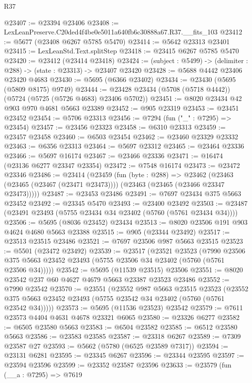\begin{lexlean}{R37}
\begin{coremodule}
@23407 := @23394 @23406
@23408 := LexLeanPreserve.C20ded4f4be0e5011a640fb6c30888a67.R37.__fits_103
@23412 := @5677 (@23408 @6267 @5785 @5470)
@23414 := @5642 @23313 @23401
@23415 := LexLeanStd.Text.splitStep
@23418 := @23415 @6267 @5785 @5470
@23420 := @23412 (@23414 @23418)
@23424 := (subject : @5499) -> (delimiter : @288) -> (state : @23313) -> @23407 @23420
@23428 := @5688 @4442 @23406 @23420 @4683
@23430 := @5695 (@6366 @23402)
@23434 := @23430 (@5695 (@5809 @8175) @9749)
@23444 := @23428 @23434 (@5708 (@5718 @4442)) (@5724 (@5725 (@5726 @4683) @23406 @5702))
@23451 := @8020 @23434 @42 @903 @970 @4681 @5663 @23389
@23452 := @905 @23319
@23453 := @23451 @23452
@23454 := @5706 @23313
@23456 := @7294 (fun ("_" : @7295) => @23454)
@23457 := @23456 @23323
@23458 := @6310 @23313
@23459 := @23457 @23458
@23460 := @6503 @23454
@23462 := @23460 @23329 @23332
@23463 := @6356 @23313
@23464 := @5697 @23312
@23465 := @23464 @23336
@23466 := @5697 @16174
@23467 := @23466 @23336
@23471 := @16474 (@23136 @6277 @23347 @23354)
@23472 := @7548 @16174
@23473 := @23472 @23346
@23486 := @23414
    (@23459
      (fun (byte : @288) =>
      @23462 (@23463 (@23465 (@23467 (@23471 @23473)))) (@23463 (@23465 (@23466 @23347 @23473)))))
@23487 := @23453 @23486
@23491 := @7697 @23434 @375 @5663 @23452
@23492 := @23345 @5470
@23493 := @23400 @23492
@23503 := @23487 (@23491 @23493 (@5755 @23434 @34 @23402 (@5760 (@5761 @23434 @34))))
@23506 := @5695 (@8036 @23452) @23434
@23513 := @8020 @23506 @191 @903 @4624 @4680 @5663 @23388
@23515 := @905 (@23344 @23492)
@23517 := @23513 @23515 @23486
@23521 := @7697 @23506 @987 @5663 @23515
@23523 := @5501 (@23472 @23492)
@23539 := @23517
    (@23521
      @23523
      (@7990 @23506 @375 @5663 @23452 @23493 (@5755 @23506 @34 @23402 (@5760 (@5761 @23506 @34)))))
@23542 := @5695 (@11539 @23515) @23506
@23551 := @8020 @23542 @237 @60 @4627 @4679 @5663 @23387 @23523 @23486
@23552 := @7990 @23542
@23570 := @23551
    (@23552
      @987
      @5663
      @23515
      @23523
      (@23552 @375 @5663 @23452 @23493 (@5755 @23542 @34 @23402 (@5760 (@5761 @23542 @34)))))
@23573 := @5695 (@11536 @23523) @23542
@23579 := @7611 @23573 @4404 @4631 @4678 @23321 @6065
@23580 := @23326 @6277
@23582 := @6505 @23580 @5663
@23583 := @6504 @23582
@23585 := @6512 @23580 @5663
@23586 := @23583 @23585
@23587 := @23318 @6267
@23589 := @7309 @23587 @27
@23593 := @5662 (@5780 (@6525 @23589 @7317))
@23594 := @23131 @6281
@23595 := @23345 @6267
@23596 := @23344 @23595
@23597 := @23594 @23596
@23599 := @23352 @23587 @23596
@23633 := @23579
    (fun (__a : @7295) =>
    @7619

\end{coremodule}
\end{lexlean}
